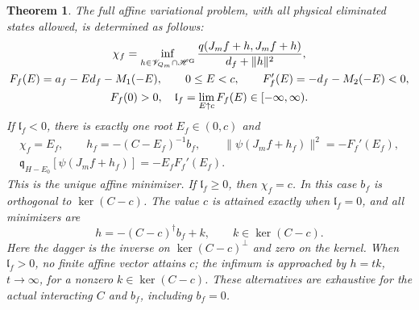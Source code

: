 \documentclass[11pt]{article}
\newtheorem{theorem}{Theorem}[section]
\newcommand{\HH}{\mathscr H}
\newcommand{\VV}{\mathscr V}
\begin{document}
\begin{theorem}
The full affine variational problem, with all physical eliminated
states allowed, is determined as follows:
\begin{gather}
 \chi_f=\inf_{h\in\VV_{Q_m}\cap\HH^{\rm G}}
           \frac{q(J_mf+h,J_mf+h)}{d_f+\|h\|^2},\nonumber\\
 F_f(E)=a_f-E d_f-M_1(-E),\qquad 0\leq E<c,\qquad
 F_f'(E)=-d_f-M_2(-E)<0,\label{eq:affineroot}\\
 F_f(0)>0,\quad
 \mathfrak l_f=\lim_{E\uparrow c}F_f(E)\in[-\infty,\infty).\nonumber
\end{gather}
If $\mathfrak l_f<0$, there is exactly one root $E_f\in(0,c)$ and
\begin{gather}
 \chi_f=E_f,\qquad
 h_f=-(C-E_f)^{-1}b_f,\qquad
 \|\psi(J_mf+h_f)\|^2=-F_f'(E_f),\nonumber\\
 \mathfrak q_{H-E_0}[\psi(J_mf+h_f)]=-E_fF_f'(E_f).
 \label{eq:affineattain}
\end{gather}
This is the unique affine minimizer. If $\mathfrak l_f\geq0$, then
$\chi_f=c$. In this case $b_f$ is orthogonal to $\ker(C-c)$.
The value $c$ is attained exactly when $\mathfrak l_f=0$, and all
minimizers are
\begin{equation}\label{eq:boundaryattain}
 h=-(C-c)^\dagger b_f+k,\qquad k\in\ker(C-c).
\end{equation}
Here the dagger is the inverse on $\ker(C-c)^\perp$ and zero on the
kernel. When $\mathfrak l_f>0$, no finite affine vector attains $c$;
the infimum is approached by $h=t k$, $t\to\infty$, for a nonzero
$k\in\ker(C-c)$. These alternatives are exhaustive for the actual
interacting $C$ and $b_f$, including $b_f=0$.
\end{theorem}
\end{document}
